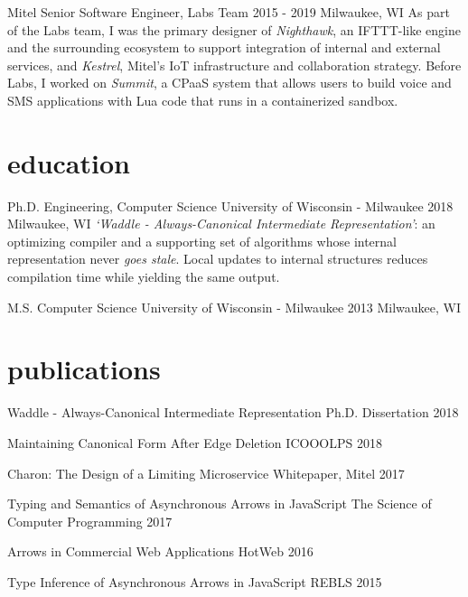 \documentclass[]{clean-resume}
\begin{document}
\detailentry
  {Mitel}
  {Senior Software Engineer, Labs Team}
  {2015 - 2019}
  {Milwaukee, WI}
  {
    As part of the Labs team, I was the primary designer of \emph{Nighthawk}, an IFTTT-like engine and the surrounding ecosystem to support integration of internal and external services, and \emph{Kestrel}, Mitel's IoT infrastructure and collaboration strategy. Before Labs, I worked on \emph{Summit}, a CPaaS system that allows users to build voice and SMS applications with Lua code that runs in a containerized sandbox.
  }

\section{education}

\detailentry
  {Ph.D. Engineering, Computer Science}
  {University of Wisconsin - Milwaukee}
  {2018}
  {Milwaukee, WI}
  {
    \emph{`Waddle - Always-Canonical Intermediate Representation'}: an optimizing compiler and a supporting set of algorithms whose internal representation never \emph{goes stale}. Local updates to internal structures reduces compilation time while yielding the same output.
  }

\detailentry
  {M.S. Computer Science}
  {University of Wisconsin - Milwaukee}
  {2013}
  {Milwaukee, WI}
  {}

\section{publications}


\lineentry
  {Waddle - Always-Canonical Intermediate Representation}
  {Ph.D. Dissertation}
  {2018}

\lineentry
  {Maintaining Canonical Form After Edge Deletion}
  {ICOOOLPS}
  {2018}

\lineentry
  {Charon: The Design of a Limiting Microservice}
  {Whitepaper, Mitel}
  {2017}

\lineentry
  {Typing and Semantics of Asynchronous Arrows in JavaScript}
  {The Science of Computer Programming}
  {2017}

\lineentry
  {Arrows in Commercial Web Applications}
  {HotWeb}
  {2016}

\lineentry
  {Type Inference of Asynchronous Arrows in JavaScript}
  {REBLS}
  {2015}
\end{document}
